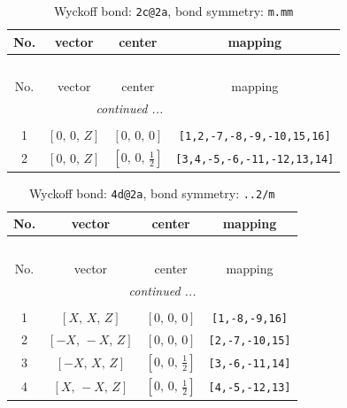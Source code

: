 \documentclass[fleqn,8pt]{jsarticle}
\begin{document}
\renewcommand{\arraystretch}{1.2}
\begin{longtable}{cccc}
\caption{Wyckoff bond: {\tt 2c@2a}, bond symmetry: {\tt m.mm}}
 \\
 \hline \hline
No. & vector & center & mapping \\ \hline \endfirsthead

\multicolumn{3}{l}{\tablename\ \thetable{}} \\
 \hline \hline
No. & vector & center & mapping \\ \hline \endhead

 \hline \hline
\multicolumn{3}{r}{\footnotesize\it continued ...} \\ \endfoot

 \hline \hline
\multicolumn{3}{r}{} \\ \endlastfoot

1 & $\left[ 0,\, 0,\, Z \right]$ & $\left[ 0,\, 0,\, 0 \right]$ & {\tt [1,2,-7,-8,-9,-10,15,16]} \\ \hline
2 & $\left[ 0,\, 0,\, Z \right]$ & $\left[ 0,\, 0,\, \frac{1}{2} \right]$ & {\tt [3,4,-5,-6,-11,-12,13,14]} \\
\end{longtable}
\renewcommand{\arraystretch}{1.2}
\begin{longtable}{cccc}
\caption{Wyckoff bond: {\tt 4d@2a}, bond symmetry: {\tt ..2/m}}
 \\
 \hline \hline
No. & vector & center & mapping \\ \hline \endfirsthead

\multicolumn{3}{l}{\tablename\ \thetable{}} \\
 \hline \hline
No. & vector & center & mapping \\ \hline \endhead

 \hline \hline
\multicolumn{3}{r}{\footnotesize\it continued ...} \\ \endfoot

 \hline \hline
\multicolumn{3}{r}{} \\ \endlastfoot

1 & $\left[ X,\, X,\, Z \right]$ & $\left[ 0,\, 0,\, 0 \right]$ & {\tt [1,-8,-9,16]} \\ \hline
2 & $\left[ - X,\, - X,\, Z \right]$ & $\left[ 0,\, 0,\, 0 \right]$ & {\tt [2,-7,-10,15]} \\ \hline
3 & $\left[ - X,\, X,\, Z \right]$ & $\left[ 0,\, 0,\, \frac{1}{2} \right]$ & {\tt [3,-6,-11,14]} \\ \hline
4 & $\left[ X,\, - X,\, Z \right]$ & $\left[ 0,\, 0,\, \frac{1}{2} \right]$ & {\tt [4,-5,-12,13]} \\
\end{longtable}
\end{document}
